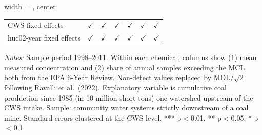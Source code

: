 \begin{table}[htbp]
\begin{adjustbox}{width = \textwidth, center}
\begin{tabular}{lcccccc}
          \\
         
         CWS fixed effects                   & $\checkmark$  & $\checkmark$          & $\checkmark$  & $\checkmark$  & $\checkmark$          & $\checkmark$\\   
         huc02-year fixed effects            & $\checkmark$  & $\checkmark$          & $\checkmark$  & $\checkmark$  & $\checkmark$          & $\checkmark$\\   
         
         \bottomrule
         
      \end{tabular}
      
      
      
   \end{adjustbox}
      {\tiny\linespread{1}\selectfont \par \raggedright 
   \textit{Notes:} Sample period 1998--2011. Within each chemical, columns show (1) mean measured concentration and (2) share of annual samples exceeding the MCL, both from the EPA 6-Year Review. Non-detect values replaced by MDL$/\sqrt{2}$ following Ravalli et al.~(2022). Explanatory variable is cumulative coal production since 1985 (in 10 million short tons) one watershed upstream of the CWS intake. Sample: community water systems strictly downstream of a coal mine. Standard errors clustered at the CWS level. *** p$<$0.01, ** p$<$0.05, * p$<$0.1.}
   
\end{table}


